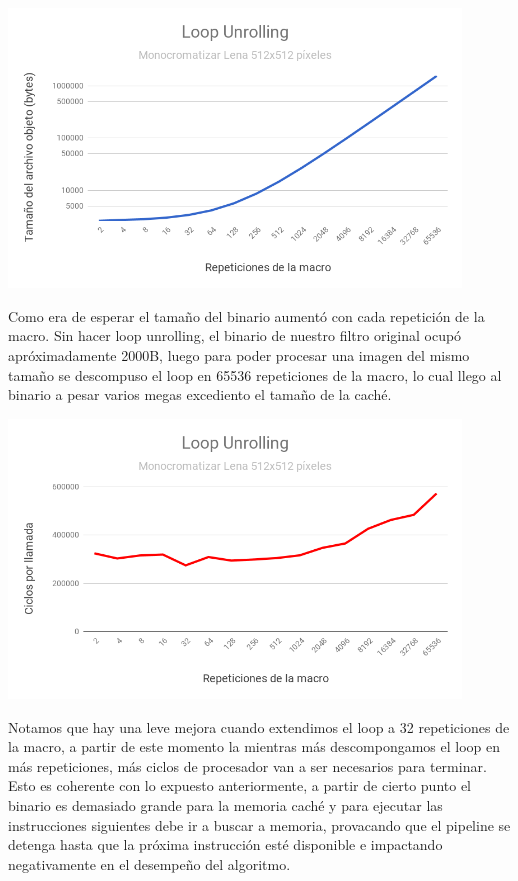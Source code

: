 \begin{center}

	\includegraphics[width=0.9\textwidth]{imagenes/loopunrolling/size.png}

\end{center}

Como era de esperar el tamaño del binario aumentó con cada repetición de la macro. Sin hacer loop unrolling, el binario de nuestro filtro original ocupó apróximadamente 2000B, luego para poder procesar una imagen del mismo tamaño se descompuso el loop en 65536 repeticiones de la macro, lo cual llego al binario a pesar varios megas excediento el tamaño de la caché.

\begin{center}

	\includegraphics[width=0.9\textwidth]{imagenes/loopunrolling/time.png}

\end{center}

Notamos que hay una leve mejora cuando extendimos el loop a 32 repeticiones de la macro, a partir de este momento la mientras más descompongamos el loop en más repeticiones, más ciclos de procesador van a ser necesarios para terminar. Esto es coherente con lo expuesto anteriormente, a partir de cierto punto el binario es demasiado grande para la memoria caché y para ejecutar las instrucciones siguientes debe ir a buscar a memoria, provacando que el pipeline se detenga hasta que la próxima instrucción esté disponible e impactando negativamente en el desempeño del algoritmo.

